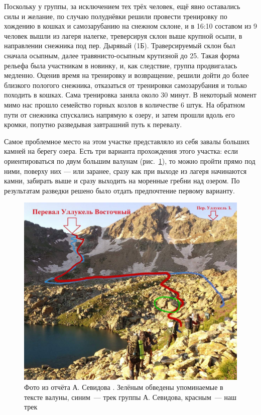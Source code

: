 Поскольку у группы, за исключением тех трёх человек, ещё явно оставались силы и желание, по случаю полуднёвки решили провести тренировку по хождению в кошках и самозарубанию на снежном склоне, и в 16:10 составом из 9 человек вышли из лагеря налегке, треверсируя склон выше крупной осыпи, в направлении снежника под пер. Дырявый (1Б). Траверсируемый склон был сначала осыпным, далее травянисто-осыпным крутизной до 25\degree. Такая форма рельефа была участникам в новинку, и, как следствие, группа продвигалась медленно. Оценив время на тренировку и возвращение, решили дойти до более близкого пологого снежника, отказаться от тренировки самозарубания и только походить в кошках. Сама тренировка заняла около 30 минут. В некоторый момент мимо нас прошло семейство горных козлов в количестве 6 штук.
На обратном пути от снежника спускались напрямую к озеру, и затем прошли вдоль его кромки, попутно разведывая завтрашний путь к перевалу. 

Самое проблемное место на этом участке представляло из себя завалы больших камней на берегу озера. Есть три варианта прохождения этого участка: если ориентироваться по двум большим валунам (рис.~\ref{fig:sevidov}), то можно пройти прямо под ними, поверху них --- или заранее, сразу как при выходе из лагеря начинаются камни, забирать выше и сразу выходить на моренные гребни над озером. По результатам разведки решено было отдать предпочтение первому варианту.

\begin{figure}[h!]
	\centering
	\includegraphics[width=0.7\linewidth]{../pics/sevidov.jpg}
	\caption{Фото из отчёта А. Севидова \cite{Sevidov2021}. Зелёным обведены упоминаемые в тексте валуны, синим~--- трек группы А. Севидова, красным~--- наш трек}
	\label{fig:sevidov}
\end{figure}

